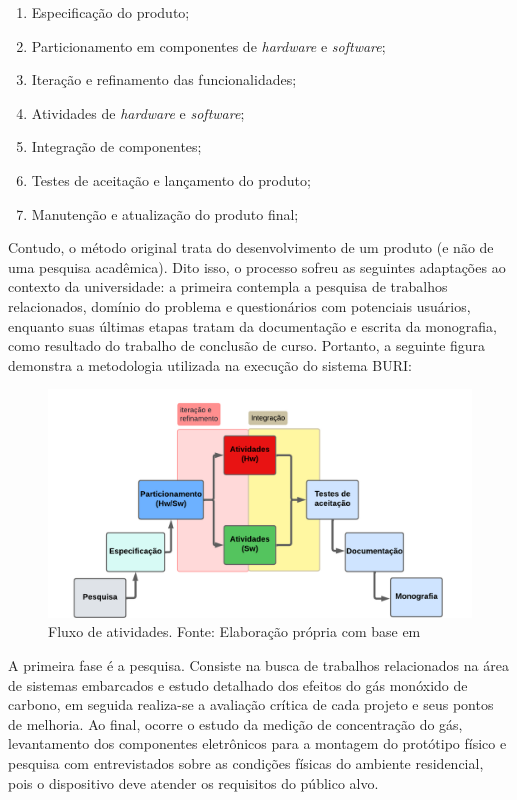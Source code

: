 \begin{enumerate}
    \item Especificação do produto;
    \item Particionamento em componentes de \textit{hardware} e \textit{software};
    \item Iteração e refinamento das funcionalidades;
    \item Atividades de \textit{hardware} e \textit{software};
    \item Integração de componentes;
    \item Testes de aceitação e lançamento do produto;
    \item Manutenção e atualização do produto final;
\end{enumerate}

Contudo, o método original trata do desenvolvimento de um produto (e não de uma pesquisa acadêmica). Dito isso, o processo sofreu as seguintes 
adaptações ao contexto da universidade: a primeira contempla a pesquisa de trabalhos relacionados, domínio do problema e questionários com potenciais usuários, enquanto suas últimas etapas tratam da documentação e escrita 
da monografia, como resultado do trabalho de conclusão de curso. Portanto, a seguinte figura demonstra a metodologia utilizada na execução do sistema BURI: 

\begin{figure}[ht]
\centering
\includegraphics[width=.82\textwidth]{img/diagrama-metodologia.png}
\caption{Fluxo de atividades. Fonte: Elaboração própria com base  em \cite{system-design-IOT}}\label{figMetodologia}
\end{figure}

A primeira fase é a pesquisa. Consiste na busca de trabalhos relacionados na área de sistemas embarcados 
e estudo detalhado dos efeitos do gás monóxido de carbono, em seguida realiza-se a avaliação crítica de cada projeto 
e seus pontos de melhoria. Ao final, ocorre o estudo da medição de concentração do gás, levantamento dos componentes 
eletrônicos para a montagem do protótipo físico e pesquisa com entrevistados sobre as condições físicas do ambiente residencial, pois o
dispositivo deve atender os requisitos do público alvo.

